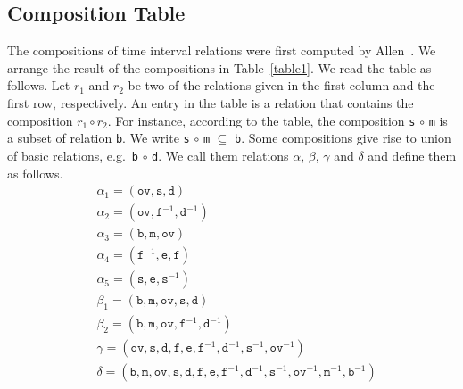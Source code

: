 \documentclass{llncs}
\begin{document}
\subsection{Composition Table}
The compositions of time interval relations were first computed by Allen~\cite{Allen:1985}. We arrange the result of the compositions in Table~\ref{table1}. We read the table as follows. Let $r_1$ and $r_2$ be two of the relations given in the first column and the first row, respectively. An entry in the table is a relation that contains the composition $r_1\circ r_2$. For instance, according to the table, the composition \texttt{s} $\circ$ \texttt{m}  is a subset of relation \texttt{b}. We write \texttt{s} $\circ$ \texttt{m} $\subseteq$ \texttt{b}. Some compositions give rise to union of basic relations, e.g.~\texttt{b} $\circ$ \texttt{d}. We call them relations $\alpha$, $\beta$, $\gamma$ and $\delta$ and define them as follows.
\begin{align*}
& \alpha_1 = (\texttt{ov}, \texttt{s}, \texttt{d}) \\ %
& \alpha_2 = (\texttt{ov}, \texttt{f}^{-1}, \texttt{d}^{-1}) \\ %
& \alpha_3 = (\texttt{b}, \texttt{m}, \texttt{ov}) \\ %
&\alpha_4 = (\texttt{f}^{-1}, \texttt{e}, \texttt{f})\\
& \alpha_5 =  (\texttt{s}, \texttt{e}, \texttt{s}^{-1})\\
& \beta_1 = (\texttt{b}, \texttt{m}, \texttt{ov}, \texttt{s}, \texttt{d}) \\ %
& \beta_2 = (\texttt{b}, \texttt{m}, \texttt{ov}, \texttt{f}^{-1}, \texttt{d}^{-1})\\ 
& \gamma = (\texttt{ov}, \texttt{s}, \texttt{d}, \texttt{f}, \texttt{e}, \texttt{f}^{-1}, \texttt{d}^{-1}, \texttt{s}^{-1}, \texttt{ov}^{-1})\\
& \delta = (\texttt{b},\texttt{m},\texttt{ov}, \texttt{s}, \texttt{d}, \texttt{f}, \texttt{e}, \texttt{f}^{-1}, \texttt{d}^{-1}, \texttt{s}^{-1}, \texttt{ov}^{-1}, \texttt{m}^{-1}, \texttt{b}^{-1})
\end{align*}
\end{document}
